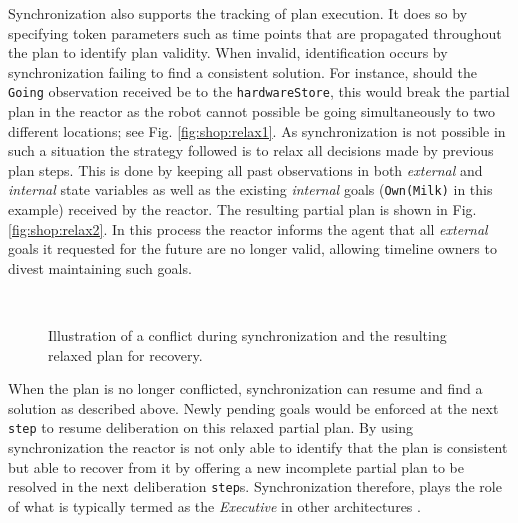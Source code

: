 Synchronization also supports the tracking of plan execution. It does
so by specifying token parameters such as time points that are
propagated throughout the plan to identify plan validity.
When invalid, identification occurs by synchronization failing to find
a consistent solution. For instance, should the \texttt{Going}
observation received be to the \texttt{hardwareStore}, this would
break the partial plan in the reactor as the robot cannot possible be
going simultaneously to two different locations; see Fig.
\ref{fig:shop:relax1}. As synchronization is not possible in such a
situation the strategy followed is to relax all decisions made by
previous plan steps. This is done by keeping all past observations in
both {\em external} and {\em internal} state variables as well as the
existing {\em internal} goals (\texttt{Own(Milk)} in this example)
received by the reactor. The resulting partial plan is shown in Fig.
\ref{fig:shop:relax2}. In this process the reactor informs the agent
that all {\em external} goals it requested for the future are no
longer valid, allowing timeline owners to divest maintaining such
goals.

\begin{figure}[!h]
  \centering
  \\
  \caption{\small Illustration of a conflict during synchronization
    and the resulting relaxed plan for recovery.}
\end{figure}

When the plan is no longer conflicted, synchronization can resume and
find a solution as described above. Newly pending goals would be
enforced at the next \texttt{step} to resume deliberation on this
relaxed partial plan. By using synchronization the reactor is not only
able to identify that the plan is consistent but able to recover from
it by offering a new incomplete partial plan to be resolved in the
next deliberation \texttt{step}s.  Synchronization therefore, plays
the role of what is typically termed as the {\em Executive} in other
architectures \cite{gat98, alami:1998p820, mus98, williams03,
  Nesnas:2003do}.

